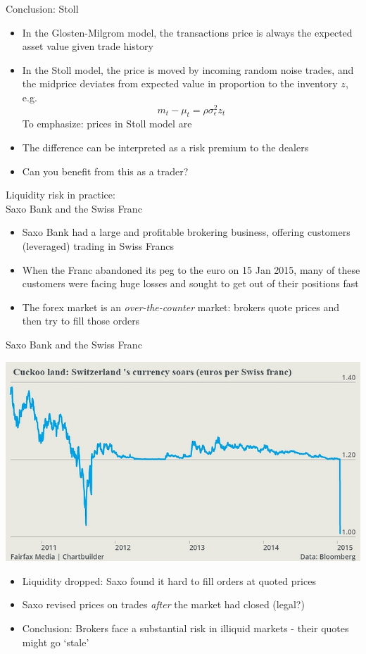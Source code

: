 \documentclass[english,10pt]{beamer}
\begin{document}
\begin{frame}{Conclusion: Stoll}
	\begin{itemize}
		\item In the Glosten-Milgrom model, the transactions price is always the expected asset value given trade history
		\item In the Stoll model, the price is moved by incoming random noise trades, and the midprice deviates from expected value in proportion to the inventory $z$, e.g.
		\[
		m_t - \mu_t = \rho \sigma^2_\epsilon z_t
		\]
		To emphasize: prices in Stoll model are 
		\item The difference can be interpreted as a risk premium to the  dealers
		\item Can you benefit from this as a trader? \pause {}
	\end{itemize}
\end{frame}


\begin{frame}{Liquidity risk in practice: \\Saxo Bank and the Swiss Franc}
	\begin{itemize}
		\item Saxo Bank had a  large and profitable brokering business, offering customers (leveraged) trading in Swiss Francs
		\item When the Franc abandoned its peg to the euro on 15 Jan 2015, many of these customers were facing huge losses and sought to get out of their positions fast
		\item The forex market is an \textit{over-the-counter} market: brokers quote prices and then try to fill those orders
	\end{itemize}
\end{frame}


\begin{frame}{Saxo Bank and the Swiss Franc}
	\begin{center}
		\includegraphics[width=0.6\linewidth]{pics/Francageddon_Image}
	\end{center}
	\begin{itemize}
		\item Liquidity dropped: Saxo found it hard to fill orders at quoted prices
		\item Saxo revised prices on trades \textit{after} the market had closed (legal?)
		\item Conclusion: Brokers face a substantial risk in illiquid markets - their quotes might go `stale'
	\end{itemize}
\end{frame}
\end{document}
